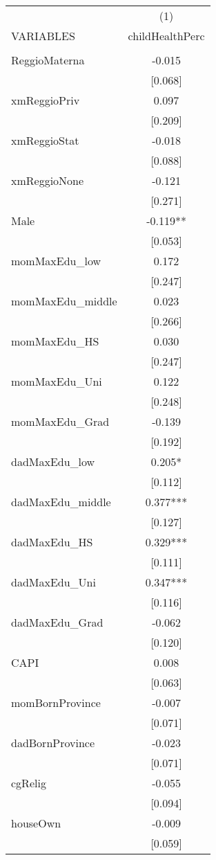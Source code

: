 \documentclass[]{article}
\begin{document}
\begin{tabular}{lc} \hline
 & (1) \\
VARIABLES & childHealthPerc \\ \hline
 &  \\
ReggioMaterna & -0.015 \\
 & [0.068] \\
xmReggioPriv & 0.097 \\
 & [0.209] \\
xmReggioStat & -0.018 \\
 & [0.088] \\
xmReggioNone & -0.121 \\
 & [0.271] \\
Male & -0.119** \\
 & [0.053] \\
momMaxEdu\_low & 0.172 \\
 & [0.247] \\
momMaxEdu\_middle & 0.023 \\
 & [0.266] \\
momMaxEdu\_HS & 0.030 \\
 & [0.247] \\
momMaxEdu\_Uni & 0.122 \\
 & [0.248] \\
momMaxEdu\_Grad & -0.139 \\
 & [0.192] \\
dadMaxEdu\_low & 0.205* \\
 & [0.112] \\
dadMaxEdu\_middle & 0.377*** \\
 & [0.127] \\
dadMaxEdu\_HS & 0.329*** \\
 & [0.111] \\
dadMaxEdu\_Uni & 0.347*** \\
 & [0.116] \\
dadMaxEdu\_Grad & -0.062 \\
 & [0.120] \\
CAPI & 0.008 \\
 & [0.063] \\
momBornProvince & -0.007 \\
 & [0.071] \\
dadBornProvince & -0.023 \\
 & [0.071] \\
cgRelig & -0.055 \\
 & [0.094] \\
houseOwn & -0.009 \\
 & [0.059] \\

\end{tabular}
\end{document}

